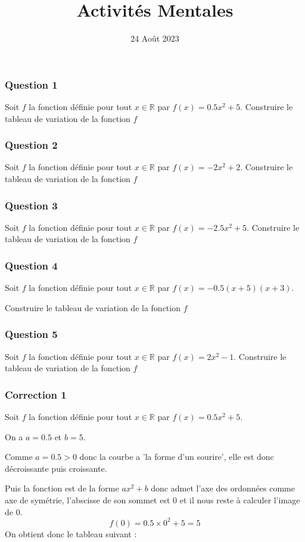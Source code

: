 \documentclass[15pt, mathserif]{beamer}
\title{Activités Mentales}
\date{24 Août 2023}
\newcommand{\R}{\mathbb{R}}			%
\begin{document}
\begin{frame}
    \titlepage
\end{frame}

\begin{frame} 
	\frametitle{Question 1}
 Soit $f$ la fonction définie pour tout $x \in \R$ par $f(x)=0.5x^2+5$. Construire le tableau de variation de la fonction $f$\end{frame}


\begin{frame} 
	\frametitle{Question 2}
 Soit $f$ la fonction définie pour tout $x \in \R$ par $f(x)=-2x^2+2$. Construire le tableau de variation de la fonction $f$\end{frame}


\begin{frame} 
	\frametitle{Question 3}
 Soit $f$ la fonction définie pour tout $x \in \R$ par $f(x)=-2.5x^2+5$. Construire le tableau de variation de la fonction $f$\end{frame}


\begin{frame} 
	\frametitle{Question 4}
 Soit $f$ la fonction définie pour tout $x \in \R$ par $f(x)=-0.5(x+5)(x+3)$. 
 
  Construire le tableau de variation de la fonction $f$\end{frame}


\begin{frame} 
	\frametitle{Question 5}
 Soit $f$ la fonction définie pour tout $x \in \R$ par $f(x)=2x^2-1$. Construire le tableau de variation de la fonction $f$\end{frame}


\begin{frame}
\vspace{-10mm}
	\frametitle{Correction 1}
\vspace*{1cm} 
 Soit $f$ la fonction définie pour tout $x \in \R$ par $f(x)=0.5x^2 +5$. 
 
 On a $a= 0.5$ et $b= 5$. 
 
 Comme $a=0.5>0$ donc la courbe a 'la forme d'un sourire', elle est donc décroissante puis croissante. 
 
 Puis la fonction est de la forme $ax^2+b$ donc admet l'axe des ordonnées comme axe de symétrie, l'abscisse de son sommet est 0 et il nous reste à calculer l'image de 0. $$f(0)= 0.5\times 0^2+5=5$$ On obtient donc le tableau suivant : 
 \begin{center} 
 \end{center} 
 \end{frame}
\end{document}
